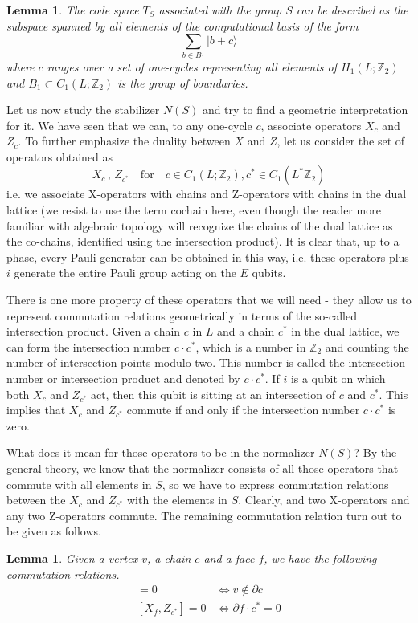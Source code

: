 \documentclass[a4paper, draft]{article}
\theoremstyle{own}
\newtheorem{lem}[thm]{Lemma}
\theoremstyle{remark}
\newcommand{\Z}{\mathbb{Z}}
\begin{document}
\begin{lem}
The code space $T_S$ associated with the group $S$ can be described as the subspace spanned by all elements of the computational basis of the form
$$
\sum_{b \in B_1} | b + c \rangle
$$
where $c$ ranges over a set of one-cycles representing all elements of $H_1(L;\Z_2)$ and $B_1 \subset C_1(L;\Z_2)$ is the group of boundaries. 
\end{lem}

Let us now study the stabilizer $N(S)$ and try to find a geometric interpretation for it. We have seen that we can, to any one-cycle $c$, associate operators $X_c$ and $Z_c$. To further emphasize the duality between $X$ and $Z$, let us consider the set of operators obtained as
$$
X_c \, , \, Z_{c^*} \quad \text{for} \quad c \in C_1(L;\Z_2) , c^* \in C_1(L^*\Z_2)
$$
i.e. we associate X-operators with chains and Z-operators with chains in the dual lattice (we resist to use the term cochain here, even though the reader more familiar with algebraic topology will recognize the chains of the dual lattice as the co-chains, identified using the intersection product). It is clear that, up to a phase, every Pauli generator can be obtained in this way, i.e. these operators plus $i$ generate the entire Pauli group acting on the $E$ qubits.

There is one more property of these operators that we will need - they allow us to represent commutation relations geometrically in terms of the so-called intersection product. Given a chain $c$ in $L$ and a chain $c^*$ in the dual lattice, we can form the intersection number $c \cdot c^*$, which is a number in $\Z_2$ and counting the number of intersection points modulo two. This number is called the intersection number or intersection product and denoted by $c \cdot c^*$. If $i$ is a qubit on which both $X_c$ and $Z_{c^*}$ act, then this qubit is sitting at an intersection of $c$ and $c^*$. This implies that $X_c$ and $Z_{c^*}$ commute if and only if the intersection number $c \cdot c^*$ is zero.

What does it mean for those operators to be in the normalizer $N(S)$? By the general theory, we know that the normalizer consists of all those operators that commute with all elements in $S$, so we have to express commutation relations between the $X_c$ and $Z_{c^*}$ with the elements in $S$. Clearly, and two X-operators and any two Z-operators commute. The remaining commutation relation turn out to be given as follows.

\begin{lem}
Given a vertex $v$, a chain $c$ and a face $f$, we have the following commutation relations.
\begin{align*}
[ X_c, Z_v  ] = 0 & \Leftrightarrow v \notin \partial c \\
[ X_f, Z_{c^*}  ] = 0 & \Leftrightarrow \partial f  \cdot c^* = 0
\end{align*}
\end{lem}
\end{document}
